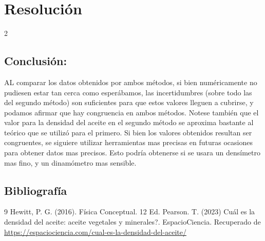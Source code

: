 \documentclass[10pt,letterpaper]{article}
\begin{document}
    \vspace{0.7cm}    

    \hline

    \section{Resolución}

    \hline

    \begin{multicols}{2}
    
        \subsection{Conclusión: }

        AL comparar los datos obtenidos por ambos métodos, si bien numéricamente no pudiesen estar tan cerca como esperábamos, las incertidumbres (sobre todo las del segundo método) son suficientes para que estos valores lleguen a cubrirse, y podamos afirmar que hay congruencia en ambos métodos. Notese también que el valor para la densidad del aceite en el segundo método se aproxima bastante al teórico que se utilizó para el primero. Si bien los valores obtenidos resultan ser congruentes, se siguiere utilizar herramientas mas precisas en futuras ocasiones para obtener datos mas precisos. Esto podría obtenerse si se usara un densímetro mas fino, y un dinamómetro mas sensible. 

        \subsection{Bibliografía}
    
        \begin{thebibliography}{9}
         Hewitt, P. G. (2016). Física Conceptual. 12 Ed. Pearson.
         T. (2023) Cuál es la densidad del aceite: aceite vegetales y minerales?. EspacioCiencia. Recuperado de \url{https://espaciociencia.com/cual-es-la-densidad-del-aceite/} 

        \end{thebibliography}


    \end{multicols}
            
    \hline

    \vspace{1cm}

  
	
\end{document}
